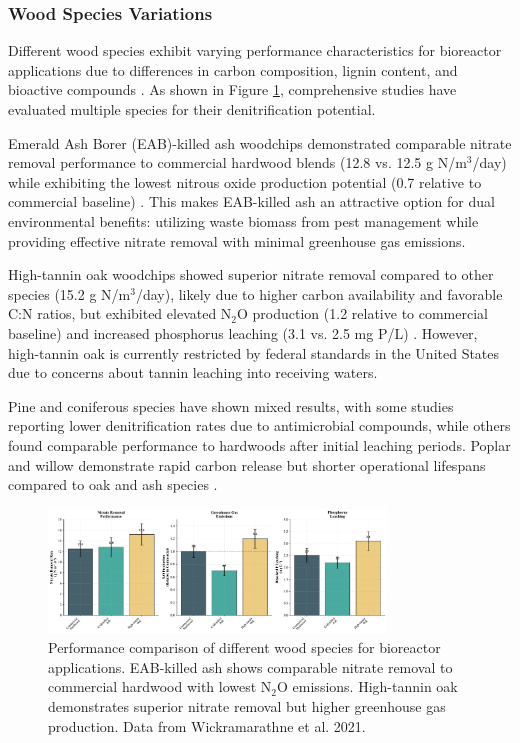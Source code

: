 \documentclass[12pt,a4paper]{article}
\begin{document}
\subsubsection{Wood Species Variations}

Different wood species exhibit varying performance characteristics for bioreactor applications due to differences in carbon composition, lignin content, and bioactive compounds \citep{RN611}. As shown in Figure \ref{fig:wood_species_comparison}, comprehensive studies have evaluated multiple species for their denitrification potential.

Emerald Ash Borer (EAB)-killed ash woodchips demonstrated comparable nitrate removal performance to commercial hardwood blends (12.8 vs. 12.5 g N/m$^3$/day) while exhibiting the lowest nitrous oxide production potential (0.7 relative to commercial baseline) \citep{RN611}. This makes EAB-killed ash an attractive option for dual environmental benefits: utilizing waste biomass from pest management while providing effective nitrate removal with minimal greenhouse gas emissions.

High-tannin oak woodchips showed superior nitrate removal compared to other species (15.2 g N/m$^3$/day), likely due to higher carbon availability and favorable C:N ratios, but exhibited elevated N$_2$O production (1.2 relative to commercial baseline) and increased phosphorus leaching (3.1 vs. 2.5 mg P/L) \citep{RN611}. However, high-tannin oak is currently restricted by federal standards in the United States due to concerns about tannin leaching into receiving waters.

Pine and coniferous species have shown mixed results, with some studies reporting lower denitrification rates due to antimicrobial compounds, while others found comparable performance to hardwoods after initial leaching periods. Poplar and willow demonstrate rapid carbon release but shorter operational lifespans compared to oak and ash species \citep{RN611}.

\begin{figure}[ht]
\centering
\includegraphics[width=0.8\textwidth]{fig9_wood_species_comparison_scientific}
\caption{Performance comparison of different wood species for bioreactor applications. EAB-killed ash shows comparable nitrate removal to commercial hardwood with lowest N$_2$O emissions. High-tannin oak demonstrates superior nitrate removal but higher greenhouse gas production. Data from Wickramarathne et al. 2021.}
\label{fig:wood_species_comparison}
\end{figure}
\end{document}
